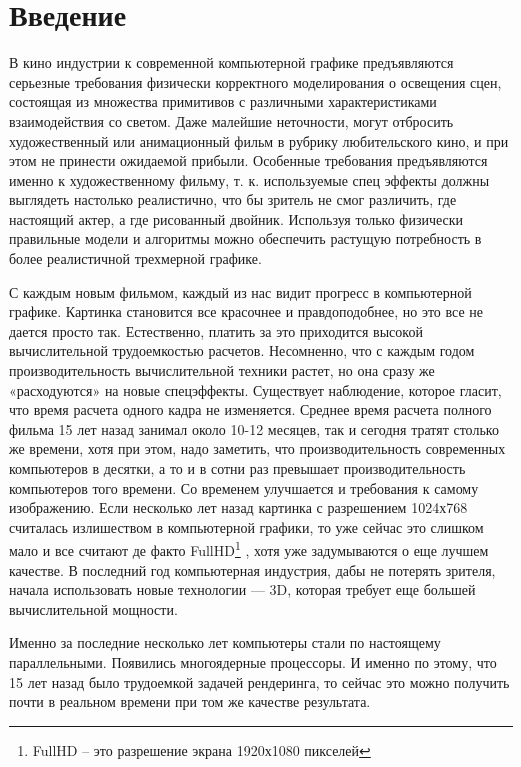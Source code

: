 \documentclass[12pt, a4paper]{article}
\begin{document}
\section*{Введение}
В кино индустрии к современной компьютерной графике предъявляются серьезные требования физически корректного моделирования о освещения сцен, состоящая из множества примитивов с различными характеристиками взаимодействия со светом. Даже малейшие неточности, могут отбросить художественный или анимационный фильм в рубрику любительского кино, и при этом не принести ожидаемой прибыли. Особенные требования предъявляются именно к художественному фильму, т. к. используемые спец эффекты должны выглядеть настолько реалистично, что бы зритель не смог различить, где настоящий актер, а где рисованный двойник. Используя только физически правильные модели и алгоритмы можно обеспечить растущую потребность в более реалистичной трехмерной графике. \par
   С каждым новым фильмом, каждый из нас видит прогресс в компьютерной графике. Картинка становится все красочнее и правдоподобнее, но это все не дается просто так. Естественно, платить за это приходится высокой вычислительной трудоемкостью расчетов. Несомненно, что с каждым годом производительность вычислительной техники растет, но она сразу же «расходуются» на новые спецэффекты. Существует наблюдение, которое гласит, что время расчета одного кадра не изменяется. Среднее время расчета полного фильма 15 лет назад занимал около 10-12 месяцев, так и сегодня тратят столько же времени, хотя при этом, надо заметить, что производительность современных компьютеров в десятки, а то и в сотни раз превышает производительность компьютеров того времени. Со временем улучшается и требования к самому изображению. Если несколько лет
назад картинка с разрешением 1024х768 считалась излишеством в компьютерной графики, то уже сейчас это слишком мало и все считают де факто FullHD\footnote{ FullHD -- это разрешение экрана 1920х1080 пикселей} , хотя уже задумываются о еще лучшем качестве. В последний год компьютерная индустрия, дабы не потерять зрителя, начала использовать новые технологии — 3D, которая требует еще большей вычислительной мощности. \par
   Именно за последние несколько лет компьютеры стали по настоящему параллельными. Появились многоядерные процессоры. И именно по этому, что 15 лет назад было трудоемкой задачей рендеринга, то сейчас это можно получить почти в реальном времени при том же качестве результата.
\end{document}
